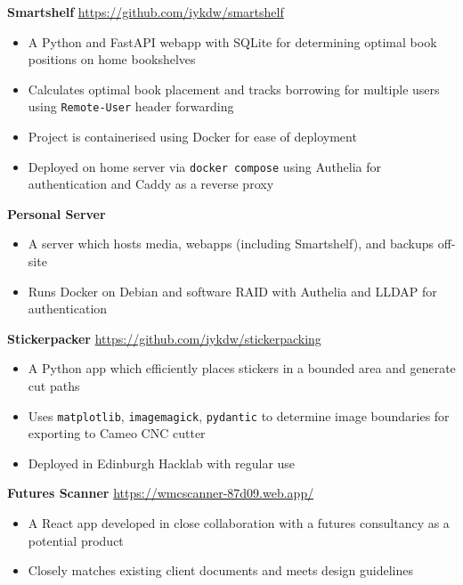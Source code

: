 \textbf{Smartshelf} \hfill \href{https://github.com/iykdw/smartshelf}{https://github.com/iykdw/smartshelf} \\

\vspace{-6pt}
\begin{itemize}
	\item A Python and FastAPI webapp with SQLite for determining optimal book positions on home bookshelves
	\item Calculates optimal book placement  and tracks borrowing for multiple users using \texttt{Remote-User} header forwarding
	\item Project is containerised using Docker for ease of deployment
	\item Deployed on home server via \texttt{docker compose} using Authelia for authentication and Caddy as a reverse proxy
\end{itemize}

\textbf{Personal Server} \\
\vspace{-6pt}
\begin{itemize}
	\item A server which hosts media, webapps (including Smartshelf), and backups off-site
	\item Runs Docker on Debian and software RAID with Authelia and LLDAP for authentication
\end{itemize}

\textbf{Stickerpacker} \hfill    \href{https://github.com/iykdw/stickerpacking}{https://github.com/iykdw/stickerpacking} \\
\vspace{-6pt}
\begin{itemize}
	\item A Python app which efficiently places stickers in a bounded area and generate cut paths
	\item Uses \texttt{matplotlib}, \texttt{imagemagick}, \texttt{pydantic} to determine image boundaries for exporting to Cameo CNC cutter
	\item Deployed in Edinburgh Hacklab with regular use
\end{itemize}

\textbf{Futures Scanner} \hfill    \href{https://wmcscanner-87d09.web.app/}{https://wmcscanner-87d09.web.app/} \\
\vspace{-6pt}
\begin{itemize}
	\item A React app developed in close collaboration with a futures consultancy as a potential product
	\item Closely matches existing client documents and meets design guidelines
\end{itemize}

